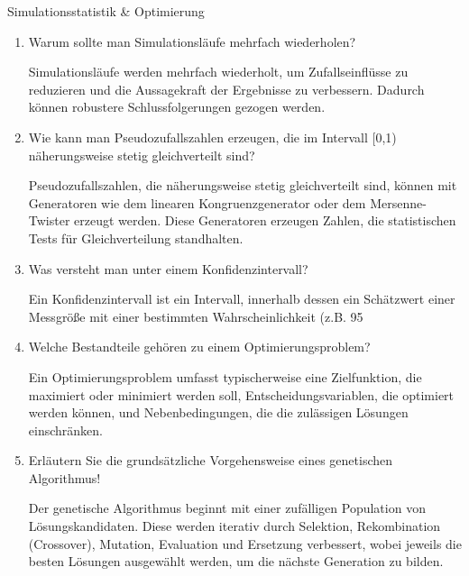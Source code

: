 \documentclass{article}
\begin{document}
\begin{exercise}{Simulationsstatistik \& Optimierung}
  \begin{enumerate}
    \item Warum sollte man Simulationsläufe mehrfach wiederholen?
          \begin{solution}
            Simulationsläufe werden mehrfach wiederholt, um Zufallseinflüsse zu reduzieren und die Aussagekraft der Ergebnisse zu verbessern. Dadurch können robustere Schlussfolgerungen gezogen werden.
          \end{solution}

    \item Wie kann man Pseudozufallszahlen erzeugen, die im Intervall [0,1) näherungsweise stetig gleichverteilt sind?
          \begin{solution}
            Pseudozufallszahlen, die näherungsweise stetig gleichverteilt sind, können mit Generatoren wie dem linearen Kongruenzgenerator oder dem Mersenne-Twister erzeugt werden. Diese Generatoren erzeugen Zahlen, die statistischen Tests für Gleichverteilung standhalten.
          \end{solution}

    \item Was versteht man unter einem Konfidenzintervall?
          \begin{solution}
            Ein Konfidenzintervall ist ein Intervall, innerhalb dessen ein Schätzwert einer Messgröße mit einer bestimmten Wahrscheinlichkeit (z.B. 95%
          \end{solution}

    \item Welche Bestandteile gehören zu einem Optimierungsproblem?
          \begin{solution}
            Ein Optimierungsproblem umfasst typischerweise eine Zielfunktion, die maximiert oder minimiert werden soll, Entscheidungsvariablen, die optimiert werden können, und Nebenbedingungen, die die zulässigen Lösungen einschränken.
          \end{solution}

    \item Erläutern Sie die grundsätzliche Vorgehensweise eines genetischen Algorithmus!
          \begin{solution}
            Der genetische Algorithmus beginnt mit einer zufälligen Population von Lösungskandidaten. Diese werden iterativ durch Selektion, Rekombination (Crossover), Mutation, Evaluation und Ersetzung verbessert, wobei jeweils die besten Lösungen ausgewählt werden, um die nächste Generation zu bilden.
          \end{solution}
  \end{enumerate}
\end{exercise}
\end{document}
